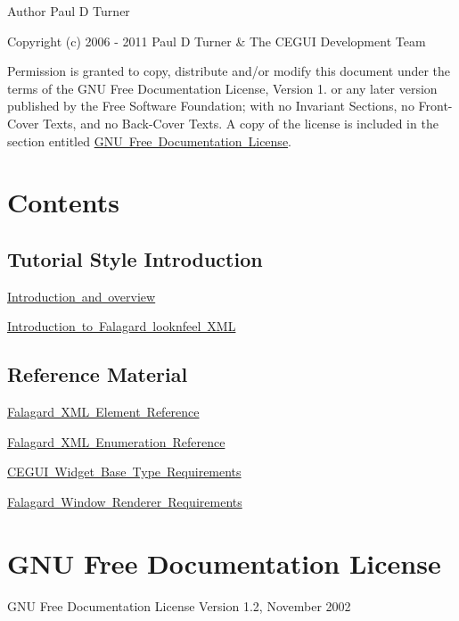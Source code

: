 \begin{DoxyAuthor}{Author}
Paul D Turner
\end{DoxyAuthor}
Copyright (c) 2006 -\/ 2011 Paul D Turner \& The C\+E\+G\+UI Development Team

Permission is granted to copy, distribute and/or modify this document under the terms of the G\+NU Free Documentation License, Version 1. or any later version published by the Free Software Foundation; with no Invariant Sections, no Front-\/\+Cover Texts, and no Back-\/\+Cover Texts. A copy of the license is included in the section entitled \mbox{\hyperlink{gnu_fdl}{G\+NU Free Documentation License}}.\hypertarget{fal_man_fal_s1}{}\section{Contents}\label{fal_man_fal_s1}
\hypertarget{fal_man_fal_s1_1}{}\subsection{Tutorial Style Introduction}\label{fal_man_fal_s1_1}

\begin{DoxyItemize}
\item \mbox{\hyperlink{fal_intro}{Introduction and overview}}
\item \mbox{\hyperlink{fal_tut1}{Introduction to Falagard \textquotesingle{}looknfeel\textquotesingle{} X\+ML}} 
\end{DoxyItemize}\hypertarget{fal_man_fal_s1_2}{}\subsection{Reference Material}\label{fal_man_fal_s1_2}

\begin{DoxyItemize}
\item \mbox{\hyperlink{fal_element_ref}{Falagard X\+ML Element Reference}}
\item \mbox{\hyperlink{fal_enum_ref}{Falagard X\+ML Enumeration Reference}}
\item \mbox{\hyperlink{fal_baseclass_ref}{C\+E\+G\+UI Widget Base Type Requirements}}
\item \mbox{\hyperlink{fal_wr_ref}{Falagard Window Renderer Requirements}} 
\end{DoxyItemize}\hypertarget{gnu_fdl}{}\section{G\+NU Free Documentation License}\label{gnu_fdl}
\begin{DoxyVerb}    GNU Free Documentation License
      Version 1.2, November 2002
\end{DoxyVerb}


